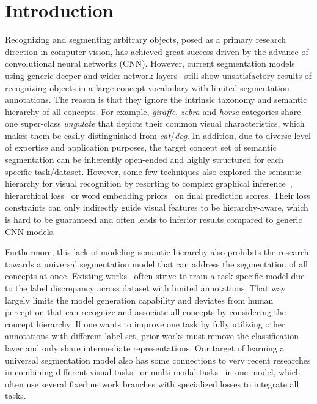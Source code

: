 \documentclass[10pt,twocolumn,letterpaper]{article}
\begin{document}
\section{Introduction}

Recognizing and segmenting arbitrary objects, posed as a primary research direction in computer vision, has achieved great success driven by the advance of convolutional neural networks (CNN). However, current segmentation models using generic deeper and wider network layers~\cite{long2015fully,chen2016deeplab,zhao2016pyramid,wu2016wider,lin2016refinenet} still show unsatisfactory results of recognizing objects in a large concept vocabulary with limited segmentation annotations. The reason is that they ignore the intrinsic taxonomy and semantic hierarchy of all concepts. For example, \emph{giraffe}, \emph{zebra} and \emph{horse} categories share one super-class \emph{ungulate} that depicts their common visual characteristics, which makes them be easily distinguished from \emph{cat}/\emph{dog}. In addition, due to diverse level of expertise and application purposes, the target concept set of semantic segmentation can be inherently open-ended and highly structured for each specific task/dataset. However, some few techniques also explored the semantic hierarchy for visual recognition by resorting to complex graphical inference~\cite{deng2014large}, hierarchical loss~\cite{redmon2016yolo9000} or word embedding priors~\cite{zhao2017open} on final prediction scores. Their loss constraints can only indirectly guide visual features to be hierarchy-aware, which is hard to be guaranteed and often leads to inferior results compared to generic CNN models. 

Furthermore, this lack of modeling semantic hierarchy also prohibits the research towards a universal segmentation model that can address the segmentation of all concepts at once. Existing works~\cite{long2015fully,chen2016deeplab,zhao2016pyramid,wu2016wider} often strive to train a task-specific model due to the label discrepancy across dataset with limited annotations. That way largely limits the model generation capability and deviates from human perception that can recognize and associate all concepts by considering the concept hierarchy. If one wants to improve one task by fully utilizing other annotations with different label set, prior works must remove the classification layer and only share intermediate representations. Our target of learning a universal segmentation model also has some connections to very recent researches in combining different visual tasks~\cite{kokkinos2016ubernet,wang2016cnn} or multi-modal tasks~\cite{kaiser2017one} in one model, which often use several fixed network branches with specialized losses to integrate all tasks. 
\end{document}
